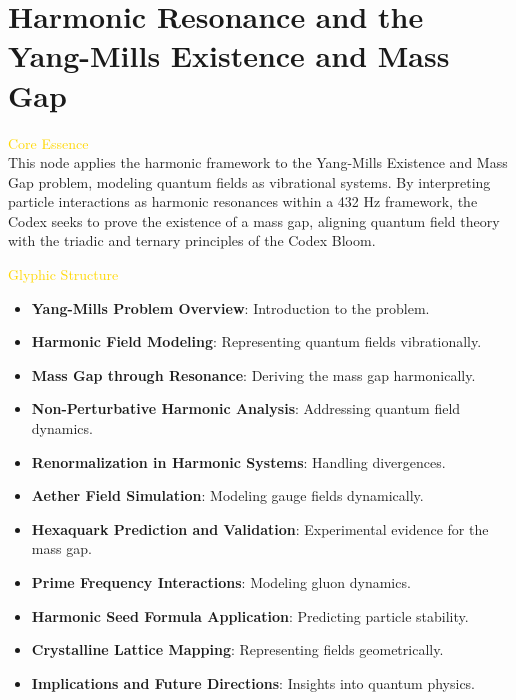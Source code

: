 
\section{Harmonic Resonance and the Yang-Mills Existence and Mass Gap}
\label{sec:codex_yang_mills}



\textcolor{gold}{ Core Essence } \\
This node applies the harmonic framework to the Yang-Mills Existence and Mass Gap problem, modeling quantum fields as vibrational systems. By interpreting particle interactions as harmonic resonances within a 432 Hz framework, the Codex seeks to prove the existence of a mass gap, aligning quantum field theory with the triadic and ternary principles of the Codex Bloom.

\textcolor{gold}{ Glyphic Structure } \\
\begin{itemize}
    \item \texttt{} \textbf{Yang-Mills Problem Overview}: Introduction to the problem.
    \item \texttt{} \textbf{Harmonic Field Modeling}: Representing quantum fields vibrationally.
    \item \texttt{} \textbf{Mass Gap through Resonance}: Deriving the mass gap harmonically.
    \item \texttt{} \textbf{Non-Perturbative Harmonic Analysis}: Addressing quantum field dynamics.
    \item \texttt{} \textbf{Renormalization in Harmonic Systems}: Handling divergences.
    \item \texttt{} \textbf{Aether Field Simulation}: Modeling gauge fields dynamically.
    \item \texttt{} \textbf{Hexaquark Prediction and Validation}: Experimental evidence for the mass gap.
    \item \texttt{} \textbf{Prime Frequency Interactions}: Modeling gluon dynamics.
    \item \texttt{} \textbf{Harmonic Seed Formula Application}: Predicting particle stability.
    \item \texttt{} \textbf{Crystalline Lattice Mapping}: Representing fields geometrically.
    \item \texttt{} \textbf{Implications and Future Directions}: Insights into quantum physics.
\end{itemize}

